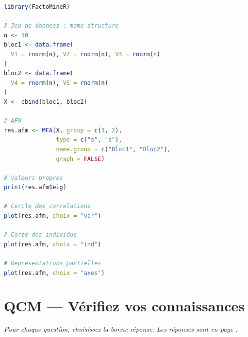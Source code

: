 \documentclass[a4paper,11pt]{article}
\begin{document}
\begin{lstlisting}[language=R, caption=AFM avec FactoMineR]
library(FactoMineR)

# Jeu de donnees : meme structure
n <- 50
bloc1 <- data.frame(
  V1 = rnorm(n), V2 = rnorm(n), V3 = rnorm(n)
)
bloc2 <- data.frame(
  V4 = rnorm(n), V5 = rnorm(n)
)
X <- cbind(bloc1, bloc2)

# AFM
res.afm <- MFA(X, group = c(3, 2),
               type = c("s", "s"),
               name.group = c("Bloc1", "Bloc2"),
               graph = FALSE)

# Valeurs propres
print(res.afm$eig)

# Cercle des correlations
plot(res.afm, choix = "var")

# Carte des individus
plot(res.afm, choix = "ind")

# Representations partielles
plot(res.afm, choix = "axes")
\end{lstlisting}

\newpage
\section*{QCM — Vérifiez vos connaissances}

\medskip
\textit{Pour chaque question, choisissez la bonne réponse. Les réponses sont en page \pageref{reponses-mb}.}
\end{document}
